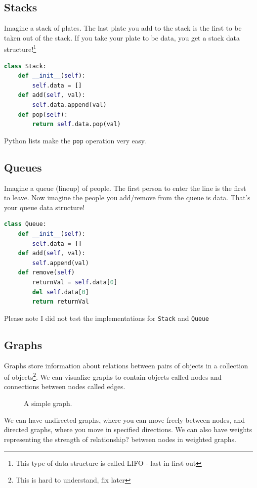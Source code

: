 \documentclass{tufte-handout}
\newcommand{\code}[1]{\colorbox{light-gray}{\texttt{#1}}}
\begin{document}
\subsection{Stacks}
Imagine a stack of plates. The last plate you add to the stack is the
first to be taken out of the stack. If you take your plate to be data,
you get a stack data structure!\footnote{This type of data structure
  is called LIFO - last in first out}
\begin{lstlisting}[language=Python]
class Stack:
    def __init__(self):
        self.data = []
    def add(self, val):
        self.data.append(val)
    def pop(self):
        return self.data.pop(val)
\end{lstlisting}
Python lists make the \code{pop} operation very easy.
\subsection{Queues}
Imagine a queue (lineup) of people. The first person to enter the line is the first to leave. Now imagine the people you add/remove from the queue is data. That's your queue data structure!
\begin{lstlisting}[language=Python]
class Queue:
    def __init__(self):
        self.data = []
    def add(self, val):
        self.append(val)
    def remove(self)
        returnVal = self.data[0]
        del self.data[0]
        return returnVal
\end{lstlisting}
Please note I did not test the implementations for \code{Stack} and \code{Queue}
\subsection{Graphs}
Graphs store information about relations between pairs of objects in a collection of objects\footnote{This is hard to understand, fix later}. We can visualize graphs to contain objects called nodes and connections between nodes called edges.
\begin{figure}[ht]
\caption{A simple graph.}
\end{figure}
We can have undirected graphs, where you can move freely between
nodes, and directed graphs, where you move in specified directions. We
can also have weights representing the strength of relationship?
between nodes in weighted graphs.
\end{document}
